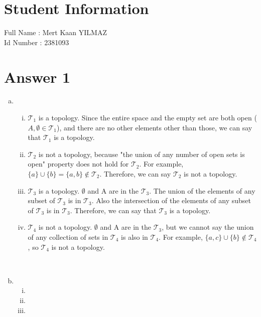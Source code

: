 \documentclass[11pt]{article}
\newcommand{\calT}{\mathcal{T}}
\begin{document}
\section*{Student Information } 
Full Name :  Mert Kaan YILMAZ\\
Id Number :  2381093\\

\section*{Answer 1}

    \begin{enumerate}[(a)]
        \item
            \begin{enumerate}[(i)]
                \item $\calT_1$ is a topology. Since the entire space and the empty set are both open ($A,\emptyset \in \calT_1$), and there are no other elements other than those, we can say that $\calT_1$ is a topology.
                
                \item $\calT_2$ is not a topology, because "the union of any number of open sets is open" property does not hold for $\calT_2$. For example, $\{a\}\cup\{b\} = \{a, b\} \notin \calT_2$. Therefore, we can say $\calT_2$ is not a topology.
                
                \item $\calT_3$ is a topology. $\emptyset$ and A are in the $\calT_3$. The union of the elements of any subset of $\calT_3$ is in $\calT_3$. Also the intersection of the elements of any subset of $\calT_3$ is in $\calT_3$. Therefore, we can say that $\calT_3$ is a topology.
                
                \item $\calT_4$ is not a topology. $\emptyset$ and A are in the $\calT_3$, but we cannot say the union of any collection of sets in $\calT_4$ is also in $\calT_4$. For example, $\{a,c\}\cup\{b\}\notin\calT_4$, so $\calT_4$ is not a topology.
            \end{enumerate}
            ~ 
        \item
            \begin{enumerate}[(i)]
                \item 
                \item 
                \item 
            \end{enumerate}
            ~ 
    \end{enumerate}
\end{document}
